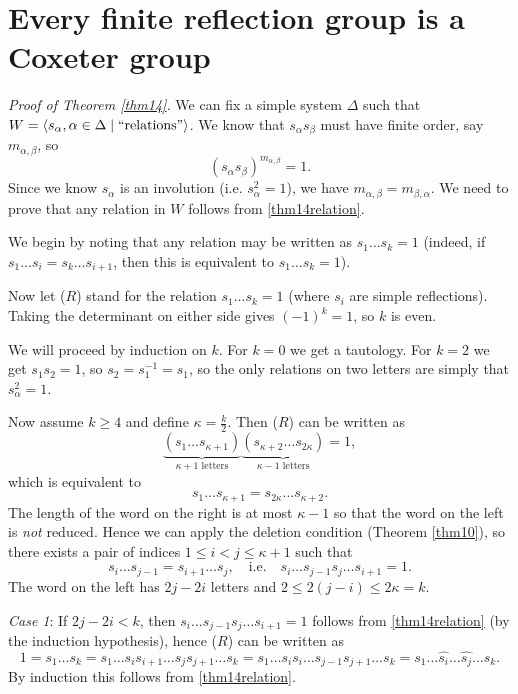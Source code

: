 \section{Every finite reflection group is a Coxeter group}

{\em Proof of Theorem \ref{thm14}.}
We can fix a simple system $\Delta$ such that
$W = \langle s_\alpha, \alpha \in \Delta \mid \text{``relations''} \rangle$. We know
that $s_\alpha s_\beta$ must have finite order, say $m_{\alpha,\beta}$, so
\begin{equation} \label{thm14relation}
(s_\alpha s_\beta)^{m_{\alpha, \beta}} = 1. \tag{\textasteriskcentered}
\end{equation}
Since we know $s_\alpha$ is an
involution (i.e. $s_\alpha^2 = 1$), we have $m_{\alpha, \beta} = m_{\beta, \alpha}$.
We need to prove that any relation in $W$ follows from \eqref{thm14relation}.

We begin by noting that any relation may be written as $s_1 \dots s_k = 1$
(indeed, if $s_1 \dots s_i = s_k \dots s_{i+1}$, then this is equivalent to
$s_1 \dots s_k = 1$).

Now let ($R$) stand for the relation $s_1 \dots s_k = 1$ (where $s_i$ are simple
reflections). Taking the determinant on either side gives $(-1)^k = 1$, so $k$
is even.

We will proceed by induction on $k$. For $k = 0$ we get a tautology.
For $k = 2$ we get $s_1 s_2 = 1$, so $s_2 = s_1^{-1} = s_1$, so the only
relations on two letters are simply that $s_\alpha^2 = 1$.

Now assume $k \geq 4$ and define $\kappa = \frac{k}{2}$. Then ($R$) can be
written as
\[
    \underbrace{(s_1 \dots s_{\kappa+1})}_{\kappa+1 \text{ letters}}
    \underbrace{(s_{\kappa+2} \dots s_{2 \kappa})}_{\kappa-1 \text{ letters}} = 1,
\]
which is equivalent to
\[
    s_1 \dots s_{\kappa+1} = s_{2 \kappa} \dots s_{\kappa + 2}.
\]
The length of the word on the right is at most $\kappa-1$ so that the word on
the left is {\em not} reduced. Hence we can apply the deletion condition (Theorem
\ref{thm10}), so there exists a pair of indices $1 \leq i < j \leq \kappa+1$
such that
\[
    s_i \dots s_{j-1} = s_{i+1} \dots s_j,
\quad
\text{i.e.}
\quad
    s_i \dots s_{j-1} s_j \dots s_{i+1} = 1.
\]
The word on the left has $2j-2i$ letters and $2 \leq 2(j-i) \leq 2\kappa = k$.

{\em Case 1}: If $2j-2i < k$, then $s_i \dots s_{j-1} s_j \dots s_{i+1} = 1$
follows from \eqref{thm14relation} (by the induction hypothesis), hence ($R$)
can be written as
\[
    1 = s_1 \dots s_k = s_1 \dots s_i s_{i+1} \dots s_j s_{j+1} \dots s_k
    = s_1 \dots s_i s_i \dots s_{j-1} s_{j+1} \dots s_k
    = s_1 \dots \hat{s_i} \dots \hat{s_j} \dots s_k.
\]
By induction this follows from \eqref{thm14relation}.

